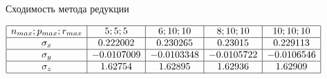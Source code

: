 \begin{table}[b]
\caption{Сходимость метода редукции}
\centering
$
\begin{array}{|c|c|c|c|c|}
\hline
n_{max}; p_{max}; r_{max} & 5; 5; 5 & 6; 10; 10 & 8; 10; 10 & 10; 10; 10 \\
\hline
\sigma_x & 0.222002		& 0.230265 	& 0.23015 		& 0.229113 \\
\hline
\sigma_y & -0.0107009 	& -0.0103348 	& -0.0105722 	& -0.0106546 \\
\hline
\sigma_z & 1.62754 		& 1.62895 		& 1.62936 		& 1.62909 \\
\hline
\end{array}
$
\label{t:8:1}
\end{table}



%

